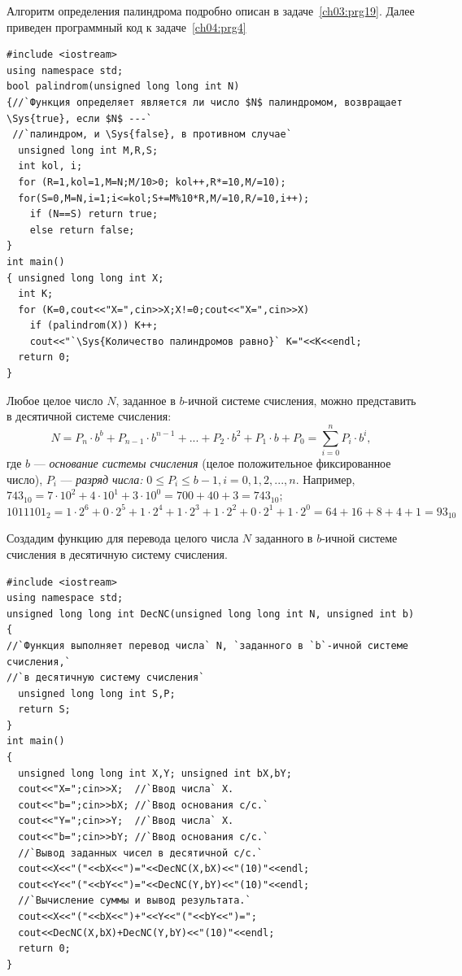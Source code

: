 
Алгоритм определения палиндрома подробно описан в задаче~\ref{ch03:prg19}. 
Далее приведен программный код к задаче~\ref{ch04:prg4}

\begin{lstlisting}
#include <iostream>
using namespace std;
bool palindrom(unsigned long long int N)
{//`Функция определяет является ли число $N$ палиндромом, возвращает \Sys{true}, если $N$ ---`
 //`палиндром, и \Sys{false}, в противном случае`
  unsigned long int M,R,S; 
  int kol, i;
  for (R=1,kol=1,M=N;M/10>0; kol++,R*=10,M/=10);
  for(S=0,M=N,i=1;i<=kol;S+=M%10*R,M/=10,R/=10,i++);
    if (N==S) return true;
    else return false;
}
int main()
{ unsigned long long int X;
  int K;
  for (K=0,cout<<"X=",cin>>X;X!=0;cout<<"X=",cin>>X)
    if (palindrom(X)) K++;
    cout<<"`\Sys{Количество палиндромов равно}` K="<<K<<endl;
  return 0;
}
\end{lstlisting}


Любое целое число $N$, заданное в $b$-ичной системе счисления, можно представить в десятичной системе счисления: 
\begin{equation*}
N=P_n\cdot b^b+P_{n-1}\cdot b^{n-1}+...+P_2\cdot b^2+P_1\cdot b+P_0=\sum_{i=0}^n{P_i\cdot b^i},
\end{equation*}
где $b$ --- \emph{основание системы счисления} (целое положительное фиксированное число), 
$P_i$  --- \emph{разряд числа:} 
$0\leqslant P_i\leqslant b-1,i=0,1,2,...,n.$
Например,\\
$743_{10}=7\cdot 10^2+4\cdot 10^1+3\cdot 10^0=700+40+3=743_{10}$;\ \  
$1011101_2=1\cdot 2^6+0\cdot 2^5+1\cdot 2^4+1\cdot 2^3+1\cdot 2^2+0\cdot 2^1+1\cdot
2^0=64+16+8+4+1=93_{10}$

Создадим функцию для перевода целого числа $N$ заданного в
$b$-ичной системе счисления в десятичную систему счисления.

\begin{lstlisting}
#include <iostream>
using namespace std;
unsigned long long int DecNC(unsigned long long int N, unsigned int b)
{
//`Функция выполняет перевод числа` N, `заданного в `b`-ичной системе счисления,` 
//`в десятичную систему счисления`
  unsigned long long int S,P;
  return S;
}
int main()
{
  unsigned long long int X,Y; unsigned int bX,bY;
  cout<<"X=";cin>>X;  //`Ввод числа` X.
  cout<<"b=";cin>>bX; //`Ввод основания с/с.`
  cout<<"Y=";cin>>Y;  //`Ввод числа` X.
  cout<<"b=";cin>>bY; //`Ввод основания с/с.`
  //`Вывод заданных чисел в десятичной с/с.`
  cout<<X<<"("<<bX<<")="<<DecNC(X,bX)<<"(10)"<<endl;
  cout<<Y<<"("<<bY<<")="<<DecNC(Y,bY)<<"(10)"<<endl;
  //`Вычисление суммы и вывод результата.`
  cout<<X<<"("<<bX<<")+"<<Y<<"("<<bY<<")=";
  cout<<DecNC(X,bX)+DecNC(Y,bY)<<"(10)"<<endl;
  return 0;
}
\end{lstlisting}


